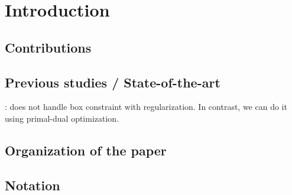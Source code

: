 \section{Introduction}


\subsection{Contributions}


\subsection{Previous studies / State-of-the-art}
\label{ssec:prev_stud}

\cite{Leeuwen_T_2021_j-siam-j-sci-comput_variable_pnp}: does not handle box
constraint with regularization. In contrast, we can do it using primal-dual
optimization.


\subsection{Organization of the paper}


\subsection{Notation}


\section{}


\section{}

